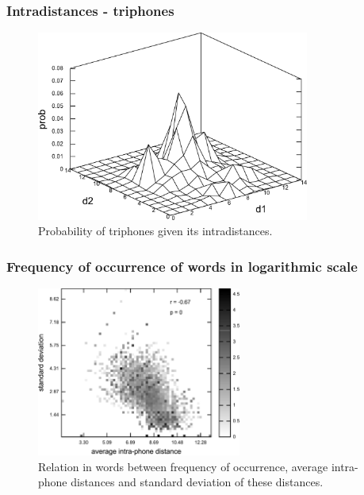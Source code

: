 \documentclass[notes]{beamer}
\begin{document}
\frame
{
  \frametitle{Intradistances - triphones}
  \vspace{-0.1cm}
  \begin{figure}[h]
  \centering  
  \includegraphics[width=0.8\textwidth]{images/ulysses_triphones_intradistances_mesh.pdf} 
  \caption{Probability of triphones given its intradistances.}
  \end{figure} 
}


\frame
{
  \frametitle{Frequency of occurrence of words in logarithmic scale}
  \vspace{-0.1cm}
  \begin{figure}[h]
  \centering
  \includegraphics[width=0.6\textwidth]{imagespresentation/ulysses_words_intra_phone_distance_freq_occ_avg_std.pdf}
  \caption{Relation in words between frequency of occurrence, average intra-phone distances and standard deviation of these distances.}
  \end{figure}
}
\end{document}
